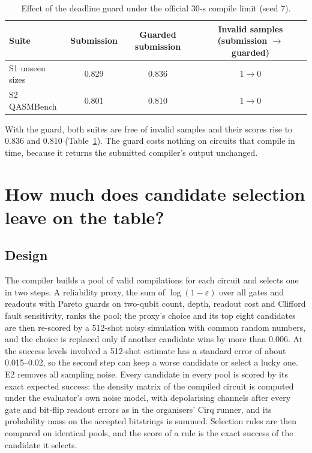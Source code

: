 \begin{table}[htbp]\centering\small
\caption{Effect of the deadline guard under the official 30-s compile limit (seed 7).}\label{tab:lxb-e1c}
\begin{tabular}{lccc}\toprule
Suite & Submission & Guarded submission & Invalid samples (submission $\to$ guarded)\\\midrule
S1 unseen sizes & 0.829 & 0.836 & $1\to0$\\
S2 QASMBench & 0.801 & 0.810 & $1\to0$\\\bottomrule
\end{tabular}
\end{table}

With the guard, both suites are free of invalid samples and their scores rise to 0.836 and 0.810 (Table~\ref{tab:lxb-e1c}). The guard costs nothing on circuits that compile in time, because it returns the submitted compiler's output unchanged.

\section{How much does candidate selection leave on the table?}

\subsection{Design}
The compiler builds a pool of valid compilations for each circuit and selects one in two steps. A reliability proxy, the sum of $\log(1-\varepsilon)$ over all gates and readouts with Pareto guards on two-qubit count, depth, readout cost and Clifford fault sensitivity, ranks the pool; the proxy's choice and its top eight candidates are then re-scored by a 512-shot noisy simulation with common random numbers, and the choice is replaced only if another candidate wins by more than 0.006. At the success levels involved a 512-shot estimate has a standard error of about 0.015--0.02, so the second step can keep a worse candidate or select a lucky one. E2 removes all sampling noise. Every candidate in every pool is scored by its exact expected success: the density matrix of the compiled circuit is computed under the evaluator's own noise model, with depolarising channels after every gate and bit-flip readout errors as in the organisers' Cirq runner, and its probability mass on the accepted bitstrings is summed. Selection rules are then compared on identical pools, and the score of a rule is the exact success of the candidate it selects.

